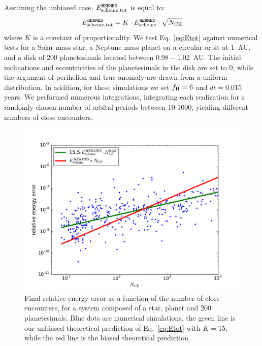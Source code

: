Assuming the unbiased case, $E_{\rm scheme,tot}^{{\sc \tt HERMES}}$ is equal to:
\begin{equation}
E_{\rm scheme,tot}^{{\sc \tt HERMES}} = K \cdot E_{\rm scheme}^{{\sc \tt HERMES}}  \cdot  \sqrt{N_{\rm CE}}
\label{eq:Etot}
\end{equation}
where $K$ is a constant of proportionality. 
We test Eq.~\ref{eq:Etot} against numerical tests for a Solar mass star, a Neptune mass planet on a circular orbit at $1$~AU, and a disk of 200 planetesimals located between $0.98 - 1.02$~AU.
The initial inclinations and eccentricities of the planetesimals in the disk are set to 0, while the argument of perihelion and true anomaly are drawn from a uniform distribution.
In addition, for these simulations we set $f_{\rm H} = 6$ and $dt = 0.015$ years. 
We performed numerous integrations, integrating each realization for a randomly chosen number of orbital periods between 10-1000, yielding different numbers of close encounters.

\begin{figure}
\centerline{\includegraphics[scale=0.45]{chap4/images/CEvdE.pdf}}
\caption{Final relative energy error as a function of the number of close encounters, for a system composed of a star, planet and 200 planetesimals. 
Blue dots are numerical simulations, the green line is our unbiased theoretical prediction of Eq.~\ref{eq:Etot} with $K = 15$, while the red line is the biased theoretical prediction.
 }
\label{fig:HSFratio}
\end{figure}


